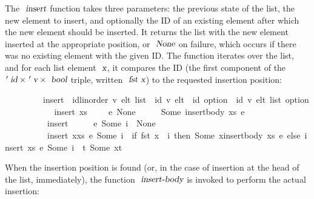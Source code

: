 The $\isa{insert}$ function takes three parameters: the previous state of the list, the new element to insert, and optionally the ID of an existing element after which the new element should be inserted.
It returns the list with the new element inserted at the appropriate position, or $\isa{None}$ on failure, which occurs if there was no existing element with the given ID.
The function iterates over the list, and for each list element $\isa{x}$, it compares the ID (the first component of the $\isacharprime\isa{id} \mathbin{\isasymtimes} \isacharprime\isa{v} \mathbin{\isasymtimes} \isa{bool}$ triple, written $\isa{fst x}$) to the requested insertion position:
\vspace{0.275em}
\begin{isabellebody}
\ \ \ \ \ \ \ \ \ insert\ {\isacharcolon}{\isacharcolon}\ {\isachardoublequoteopen}{\isacharparenleft}{\isacharprime}id{\isacharcolon}{\isacharcolon}{\isacharbraceleft}linorder{\isacharbraceright}{\isacharcomma}\ {\isacharprime}v{\isacharparenright}\ elt\ list\ {\isasymRightarrow}\ {\isacharparenleft}{\isacharprime}id{\isacharcomma}\ {\isacharprime}v{\isacharparenright}\ elt\ {\isasymRightarrow}\ {\isacharprime}id\ option\ {\isasymRightarrow}\ {\isacharparenleft}{\isacharprime}id{\isacharcomma}\ {\isacharprime}v{\isacharparenright}\ elt\ list\ option{\isachardoublequoteclose}\ \isanewline
\ \ \ \ \ \ \ \ \ \ {\isachardoublequoteopen}insert\ xs\ \ \ \ \ e\ None\ \ \ \ \ {\isacharequal}\ Some\ {\isacharparenleft}insert{\isacharunderscore}body\ xs\ e{\isacharparenright}{\isachardoublequoteclose}\ {\isacharbar}\isanewline
\ \ \ \ \ \ \ \ \ \ {\isachardoublequoteopen}insert\ {\isacharbrackleft}{\isacharbrackright}\ \ \ \ \ e\ {\isacharparenleft}Some\ i{\isacharparenright}\ {\isacharequal}\ None{\isachardoublequoteclose}\ {\isacharbar}\isanewline
\ \ \ \ \ \ \ \ \ \ {\isachardoublequoteopen}insert\ {\isacharparenleft}x{\isacharhash}xs{\isacharparenright}\ e\ {\isacharparenleft}Some\ i{\isacharparenright}\ {\isacharequal}\ {\isacharparenleft}if\ fst\ x\ {\isacharequal}\ i\ then\ Some\ {\isacharparenleft}x{\isacharhash}insert{\isacharunderscore}body\ xs\ e{\isacharparenright}\ else\ insert\ xs\ e\ {\isacharparenleft}Some\ i{\isacharparenright}\ {\isasymbind}\ {\isacharparenleft}{\isasymlambda}t{\isachardot}\ Some\ {\isacharparenleft}x{\isacharhash}t{\isacharparenright}{\isacharparenright}{\isacharparenright}{\isachardoublequoteclose}
\end{isabellebody}
\vspace{0.275em}
When the insertion position is found (or, in the case of insertion at the head of the list, immediately), the function $\isa{insert-body}$ is invoked to perform the actual insertion:
